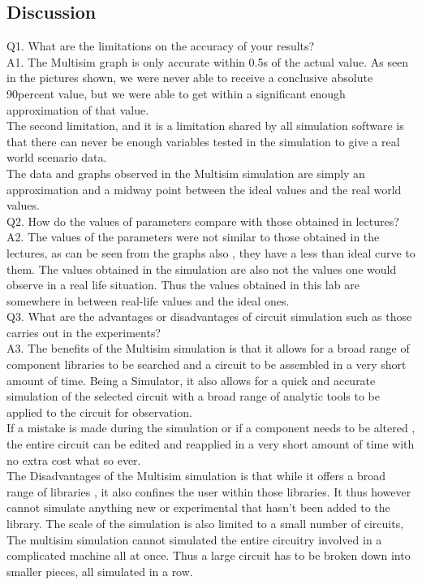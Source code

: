 \documentclass{article}
\begin{document}
\pagebreak

\begin{flushleft}
\section{Discussion}\label{sec:discuss}\underline{}


Q1. What are the limitations on the accuracy of your results?\\
A1. The Multisim graph is only accurate within 0.5s of the actual value. As seen in the pictures shown, we were never able to receive a conclusive absolute 90percent value, but we were able to get within a significant enough approximation of that value.\\
The second limitation, and it is a limitation shared by all simulation software is that there can never be enough variables tested in the simulation to give a real world scenario data. \\
The data and graphs observed in the Multisim simulation are simply an approximation and a midway point between the ideal values and the real world values. \\
Q2. How do the values of parameters compare with those obtained in lectures?\\
A2. The values of the parameters were not similar to those obtained in the lectures, as can be seen from the graphs also , they have a less than ideal curve to them. The values obtained in the simulation are also not the values one would observe in a real life situation. Thus the values obtained in this lab are somewhere in between real-life values and the ideal ones.\\
Q3. What are the advantages or disadvantages of circuit simulation such as those carries out in the experiments?\\
A3. The benefits of the Multisim simulation is that it allows for a broad range of component libraries to be searched and a circuit to be assembled in a very short amount of time.
Being a Simulator, it also allows for a quick and accurate simulation of the selected circuit with a broad range of analytic tools to be applied to the circuit for observation.\\
If a mistake is made during the simulation or if a component needs to be altered , the entire circuit can be edited and reapplied in a very short amount of time with no extra cost what so ever. \\
The Disadvantages of the Multisim simulation is that while it offers a broad range of libraries , it also confines the user within those libraries. It thus however cannot simulate anything new or experimental that hasn't been added to the library. The scale of the simulation is also limited to a small number of circuits, The multisim simulation cannot simulated the entire circuitry involved in a complicated machine all at once. Thus a large circuit has to be broken down into smaller pieces, all simulated in a row.

\end{flushleft}
\end{document}
